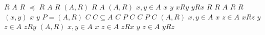 \documentclass{article}
\begin{document}
$R$
$A$
$R$
$\preceq $
$R$
$A$
$R$
$(A, R)$
$R$
$A$
$(A, R)$
$x, y \in A$
$x$
$y$
$x R y$
$y R x$
$R$
$R$
$A$
$R$
$R$
$(x,y)$
$x$
$y$
$P = (A, R)$
$C$
$C \subseteq A$
$C$
$P$
$C$
$C$
$P$
$C$
$(A,R)$
$x, y \in A$
$x$
$z \in A$
$x R z$
$y$
$z \in A$
$z R y$
$(A,R)$
$x, y \in A$
$x$
$z \in A$
$z R x$
$y$
$z \in A$
$y R z$
\end{document}
